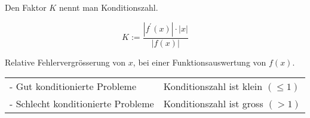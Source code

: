 Den Faktor $K$ nennt man Konditionszahl.

$$
K:=\frac{\left|f^{\prime}(x)\right| \cdot|x|}{|f(x)|}
$$

Relative Fehlervergrösserung von $x$, bei einer Funktionsauswertung von $f(x)$.

\begin{center}
\begin{tabular}{ll}
- Gut konditionierte Probleme & Konditionszahl ist klein $(\leq 1)$ \\
- Schlecht konditionierte Probleme & Konditionszahl ist gross $(>1)$ \\
\end{tabular}
\end{center}